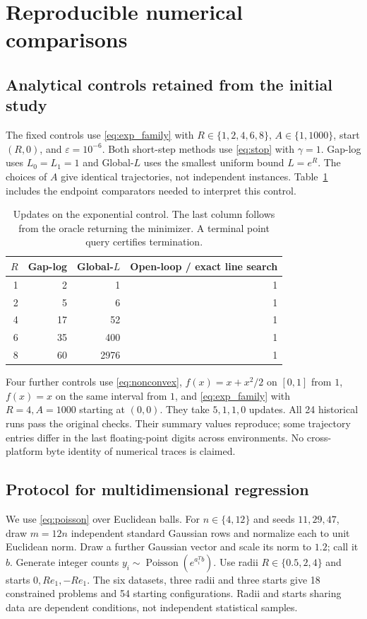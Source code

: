 \section{Reproducible numerical comparisons}\label{sec:experiments}
\subsection{Analytical controls retained from the initial study}
The fixed controls use \eqref{eq:exp_family} with
$R\in\{1,2,4,6,8\}$, $A\in\{1,1000\}$, start $(R,0)$, and
$\varepsilon=10^{-6}$. Both short-step methods use \eqref{eq:stop}
with $\gamma=1$. Gap-log uses $L_0=L_1=1$ and Global-$L$ uses the
smallest uniform bound $L=e^R$. The choices of $A$ give identical
trajectories, not independent instances. Table~\ref{tab:endpoint}
includes the endpoint comparators needed to interpret this control.
\begin{table}[ht]
\centering
\caption{Updates on the exponential control. The last column follows
from the oracle returning the minimizer. A terminal point query
certifies termination.}\label{tab:endpoint}
\begin{tabular}{rrrr}
\toprule
$R$ & Gap-log & Global-$L$ & Open-loop / exact line search\\
\midrule
1 & 2 & 1 & 1\\
2 & 5 & 6 & 1\\
4 & 17 & 52 & 1\\
6 & 35 & 400 & 1\\
8 & 60 & 2976 & 1\\
\bottomrule
\end{tabular}
\end{table}
Four further controls use \eqref{eq:nonconvex}, $f(x)=x+x^2/2$
on $[0,1]$ from $1$, $f(x)=x$ on the same interval from $1$, and
\eqref{eq:exp_family} with $R=4,A=1000$ starting at $(0,0)$.
They take $5,1,1,0$ updates. All 24 historical runs pass the original
checks. Their summary values reproduce; some trajectory entries differ
in the last floating-point digits across environments. No cross-platform
byte identity of numerical traces is claimed.

\subsection{Protocol for multidimensional regression}
We use \eqref{eq:poisson} over Euclidean balls. For
$n\in\{4,12\}$ and seeds $11,29,47$, draw $m=12n$ independent
standard Gaussian rows and normalize each to unit Euclidean norm.
Draw a further Gaussian vector and scale its norm to $1.2$; call it
$b$. Generate integer counts $y_i\sim\operatorname{Poisson}(e^{a_i^Tb})$.
Use radii $R\in\{0.5,2,4\}$ and starts $0,Re_1,-Re_1$.
The six datasets, three radii and three starts give 18 constrained
problems and 54 starting configurations. Radii and starts sharing data
are dependent conditions, not independent statistical samples.

